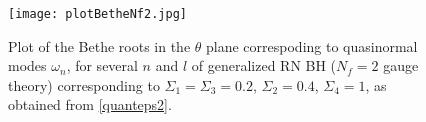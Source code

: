 \documentclass[11pt,a4paper]{elsarticle}
\def \th {\theta}
\def \ba {\begin{aligned}}
\def \ea {\end{aligned}}
\newcommand{\be}{\begin{equation}}
\newcommand{\ee}{\end{equation}}
\def\th{\theta}
\numberwithin{figure}{section}
\numberwithin{table}{section}
\begin{document}
\begin{figure}
\centering
\texttt{[image: plotBetheNf2.jpg]}
\caption{Plot of the Bethe roots in the $\theta$ plane correspoding to quasinormal modes $\omega_n$, for several $n$ and $l$ of generalized RN BH ($N_f=2$ gauge theory) corresponding to $\Sigma_1=\Sigma_3=0.2$, $\Sigma_2 = 0.4$, $\Sigma_4=1$, as obtained from \eqref{quanteps2}.} \label{plotBetheRootsNf2}
\end{figure}



\begin{comment}
\textcolor{blue}{As about (\ref{Tnua}), we equate the invariant trace of the monodromy matrix in the two bases and obtain equalities involving now also the equal masses $q_1=q_2\equiv q$ 
\be \label{TnuNf=2}
\ba
2 \cos 2\pi \nu + 2 \cos 2 \pi q_2 &= T_{+,+}(\th)T_{+,-}(\th+i \frac{\pi}{2})\\
2 \cos 2\pi \nu + 2 \cos 2 \pi q_1 &= \tilde{T}_{+,+}(\th )\tilde{T}_{-,+}(\th+i\frac{\pi}{2})
\ea
\ee 
This generalises a simpler formula conjectured in ~\cite{FateevLukyanov:2005} and should give a proof method for the one guessed in ~\cite{FioravantiPoghossian:2019}. Besides, also in this case the period $a=\nu$, the Floquet index. Then, on plugging $T_{+,-}(\th+i \frac{\pi}{2})= T_{+,+}(\th)$, $\tilde{T}_{-,+}(\th+i\frac{\pi}{2})= \tilde{T}_{+,+}(\th)$ and ~\eqref{TTqNf=2} in ~\eqref{TnuNf=2}}
\end{comment}
\end{document}
